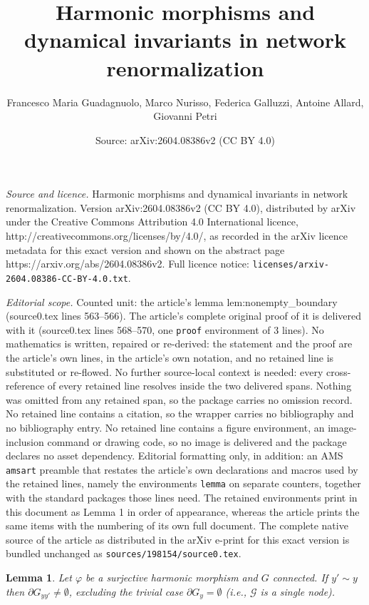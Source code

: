 \documentclass[10pt,a4paper]{amsart}
\title{Harmonic morphisms and dynamical invariants in network renormalization}
\author{Francesco Maria Guadagnuolo, Marco Nurisso, Federica Galluzzi, Antoine Allard, Giovanni Petri}
\date{Source: arXiv:2604.08386v2 (CC BY 4.0)}
\newtheorem{lemma}{Lemma}
\begin{document}
\maketitle

\noindent\emph{Source and licence.} Harmonic morphisms and dynamical invariants in network renormalization. Version arXiv:2604.08386v2 (CC BY 4.0), distributed by arXiv under the Creative Commons Attribution 4.0 International licence, http://creativecommons.org/licenses/by/4.0/, as recorded in the arXiv licence metadata for this exact version and shown on the abstract page https://arxiv.org/abs/2604.08386v2. Full licence notice: \texttt{licenses/arxiv-2604.08386-CC-BY-4.0.txt}.\par\smallskip

\noindent\textit{Editorial scope.} Counted unit: the article's lemma lem:nonempty\_boundary (source0.tex lines 563--566). The article's complete original proof of it is delivered with it (source0.tex lines 568--570, one \texttt{proof} environment of 3 lines). No mathematics is written, repaired or re-derived: the statement and the proof are the article's own lines, in the article's own notation, and no retained line is substituted or re-flowed.  No further source-local context is needed: every cross-reference of every retained line resolves inside the two delivered spans.  Nothing was omitted from any retained span, so the package carries no omission record.  No retained line contains a citation, so the wrapper carries no bibliography and no bibliography entry.  No retained line contains a figure environment, an image-inclusion command or drawing code, so no image is delivered and the package declares no asset dependency.  Editorial formatting only, in addition: an AMS \texttt{amsart} preamble that restates the article's own declarations and macros used by the retained lines, namely the environments \texttt{lemma} on separate counters, together with the standard packages those lines need.  The retained environments print in this document as Lemma 1 in order of appearance, whereas the article prints the same items with the numbering of its own full document.  The complete native source of the article as distributed in the arXiv e-print for this exact version is bundled unchanged as \texttt{sources/198154/source0.tex}.
\begin{lemma}
\label{lem:nonempty_boundary}
Let $\varphi$ be a surjective harmonic morphism and $G$ connected. If $y' \sim y$ then $\partial G_{yy'} \neq \emptyset$, excluding the trivial case $\partial G_y = \emptyset$ (i.e., $\mathcal{G}$ is a single node).
\end{lemma}
\end{document}
